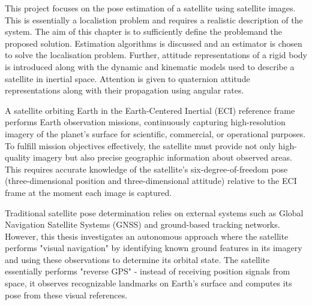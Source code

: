 \label{chap:modelling}

\label{sec:modintro}

This project focuses on the pose estimation of a satellite using satellite images. This is essentially a localistion problem
and requires a realistic description of the system. The aim of this chapter is to sufficiently define the problemand the proposed solution. Estimation
algorithms is discussed and an estimator is chosen to solve the localisation problem. Further, attitude representations of a rigid body is introduced
along with the dynamic and kinematic models used to describe a satellite in inertial space. Attention is given to quaternion attitude representations along
with their propagation using angular rates.

\label{sec:moddef}


A satellite orbiting Earth in the Earth-Centered Inertial (ECI) reference frame performs Earth observation missions, 
continuously capturing high-resolution imagery of the planet's surface for scientific, commercial, or operational purposes. 
To fulfill mission objectives effectively, the satellite must provide not only high-quality imagery but also precise geographic 
information about observed areas. This requires accurate knowledge of the satellite's six-degree-of-freedom pose 
(three-dimensional position and three-dimensional attitude) relative to the ECI frame at the moment each image is captured.
\vspace{0.5cm}

Traditional satellite pose determination relies on external systems such as Global Navigation Satellite Systems (GNSS) 
and ground-based tracking networks. However, this thesis investigates an autonomous approach where the satellite performs 
"visual navigation" by identifying known ground features in its imagery and using these observations to determine its orbital 
state. The satellite essentially performs "reverse GPS" - instead of receiving position signals from space, it observes 
recognizable landmarks on Earth's surface and computes its pose from these visual references.
\vspace{0.5cm}

